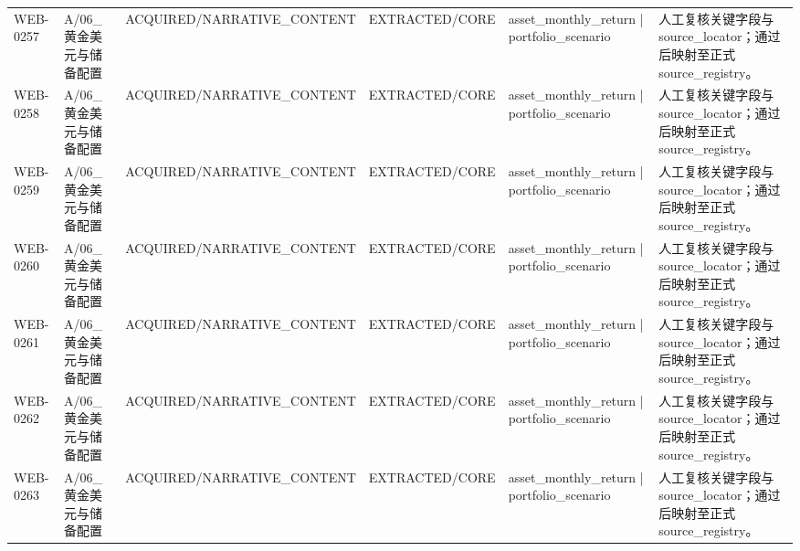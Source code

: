 \begin{landscape}
\begin{longtable}{p{1.8cm}p{2.6cm}p{2.6cm}p{2.6cm}p{4.8cm}p{7.2cm}}
WEB-0257 & A/\allowbreak{}06\_\allowbreak{}黄金美元与储备配置 & ACQUIRED/\allowbreak{}NARRATIVE\_\allowbreak{}CONTENT & EXTRACTED/\allowbreak{}CORE & asset\_\allowbreak{}monthly\_\allowbreak{}return | portfolio\_\allowbreak{}scenario & 人工复核关键字段与source\_\allowbreak{}locator；通过后映射至正式source\_\allowbreak{}registry。\\
WEB-0258 & A/\allowbreak{}06\_\allowbreak{}黄金美元与储备配置 & ACQUIRED/\allowbreak{}NARRATIVE\_\allowbreak{}CONTENT & EXTRACTED/\allowbreak{}CORE & asset\_\allowbreak{}monthly\_\allowbreak{}return | portfolio\_\allowbreak{}scenario & 人工复核关键字段与source\_\allowbreak{}locator；通过后映射至正式source\_\allowbreak{}registry。\\
WEB-0259 & A/\allowbreak{}06\_\allowbreak{}黄金美元与储备配置 & ACQUIRED/\allowbreak{}NARRATIVE\_\allowbreak{}CONTENT & EXTRACTED/\allowbreak{}CORE & asset\_\allowbreak{}monthly\_\allowbreak{}return | portfolio\_\allowbreak{}scenario & 人工复核关键字段与source\_\allowbreak{}locator；通过后映射至正式source\_\allowbreak{}registry。\\
WEB-0260 & A/\allowbreak{}06\_\allowbreak{}黄金美元与储备配置 & ACQUIRED/\allowbreak{}NARRATIVE\_\allowbreak{}CONTENT & EXTRACTED/\allowbreak{}CORE & asset\_\allowbreak{}monthly\_\allowbreak{}return | portfolio\_\allowbreak{}scenario & 人工复核关键字段与source\_\allowbreak{}locator；通过后映射至正式source\_\allowbreak{}registry。\\
WEB-0261 & A/\allowbreak{}06\_\allowbreak{}黄金美元与储备配置 & ACQUIRED/\allowbreak{}NARRATIVE\_\allowbreak{}CONTENT & EXTRACTED/\allowbreak{}CORE & asset\_\allowbreak{}monthly\_\allowbreak{}return | portfolio\_\allowbreak{}scenario & 人工复核关键字段与source\_\allowbreak{}locator；通过后映射至正式source\_\allowbreak{}registry。\\
WEB-0262 & A/\allowbreak{}06\_\allowbreak{}黄金美元与储备配置 & ACQUIRED/\allowbreak{}NARRATIVE\_\allowbreak{}CONTENT & EXTRACTED/\allowbreak{}CORE & asset\_\allowbreak{}monthly\_\allowbreak{}return | portfolio\_\allowbreak{}scenario & 人工复核关键字段与source\_\allowbreak{}locator；通过后映射至正式source\_\allowbreak{}registry。\\
WEB-0263 & A/\allowbreak{}06\_\allowbreak{}黄金美元与储备配置 & ACQUIRED/\allowbreak{}NARRATIVE\_\allowbreak{}CONTENT & EXTRACTED/\allowbreak{}CORE & asset\_\allowbreak{}monthly\_\allowbreak{}return | portfolio\_\allowbreak{}scenario & 人工复核关键字段与source\_\allowbreak{}locator；通过后映射至正式source\_\allowbreak{}registry。\\

\end{longtable}
\end{landscape}

